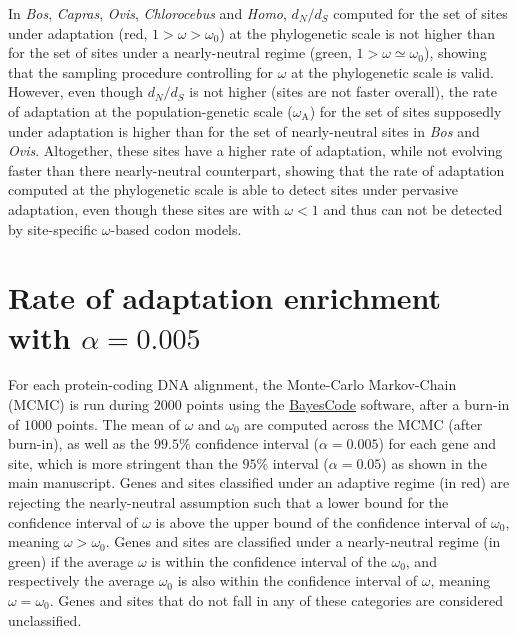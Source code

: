\documentclass{article}
\renewcommand*{\bm}[1]{#1}%
\newcommand{\dn}{d_N}
\newcommand{\ds}{d_S}
\newcommand{\dnds}{\dn / \ds}
\newcommand{\rateApop}{\omega_{\mathrm{A}}}
\begin{document}
    \pagebreak

    

    In \textit{Bos}, \textit{Capras}, \textit{Ovis}, \textit{Chlorocebus} and \textit{Homo}, $\dnds$ computed for the set of sites under adaptation (red, $1 > \omega > \omega_{0}$) at the phylogenetic scale is not higher than for the set of sites under a nearly-neutral regime (green, $1 > \omega \simeq \omega_{0}$), showing that the sampling procedure controlling for $\omega$ at the phylogenetic scale is valid.
    However, even though $\dnds$ is not higher (sites are not faster overall), the rate of adaptation at the population-genetic scale ($\rateApop$) for the set of sites supposedly under adaptation is higher than for the set of nearly-neutral sites in \textit{Bos} and \textit{Ovis}.
    Altogether, these sites have a higher rate of adaptation, while not evolving faster than there nearly-neutral counterpart, showing that the rate of adaptation computed at the phylogenetic scale is able to detect sites under pervasive adaptation, even though these sites are with $\omega < 1$ and thus can not be detected by site-specific $\omega$-based codon models.

    \pagebreak

    \section{Rate of adaptation enrichment with $\bm{\alpha=0.005}$}
    \label{sec:threshold}
    For each protein-coding DNA alignment, the Monte-Carlo Markov-Chain (MCMC) is run during $2000$ points using the \href{https://github.com/bayesiancook/bayescode}{BayesCode} software, after a burn-in of $1000$ points.
    The mean of $\omega$ and $\omega_{0}$ are computed across the MCMC (after burn-in), as well as the $99.5$\% confidence interval ($\alpha=0.005$) for each gene and site, which is more stringent than the $95$\% interval ($\alpha=0.05$) as shown in the main manuscript.
    Genes and sites classified under an adaptive regime (in red) are rejecting the nearly-neutral assumption such that a lower bound for the confidence interval of $\omega$ is above the upper bound of the confidence interval of $\omega_{0}$, meaning $\omega > \omega_{0}$.
    Genes and sites are classified under a nearly-neutral regime (in green) if the average $\omega$ is within the confidence interval of the $\omega_{0}$, and respectively the average $\omega_{0}$ is also within the confidence interval of  $\omega$, meaning $\omega = \omega_{0}$.
    Genes and sites that do not fall in any of these categories are considered unclassified.
\end{document}
